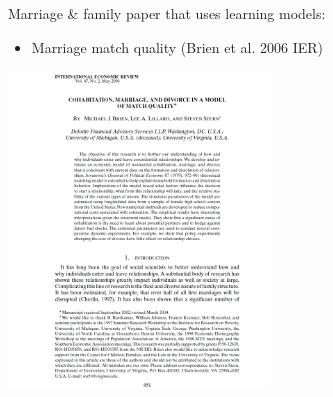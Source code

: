 \documentclass[aspectratio=169]{beamer}
\begin{document}
\begin{frame}
Marriage \& family paper that uses learning models:
\bigskip\par
\begin{itemize}
\itemsep1.5em
\item Marriage match quality (Brien et al. 2006 IER)
\end{itemize}
\end{frame}

\begin{frame}
\centering
\includegraphics[width=0.52\textwidth]{Brien_et_al_2006_IER_cover.jpg}
\end{frame}
\end{document}
